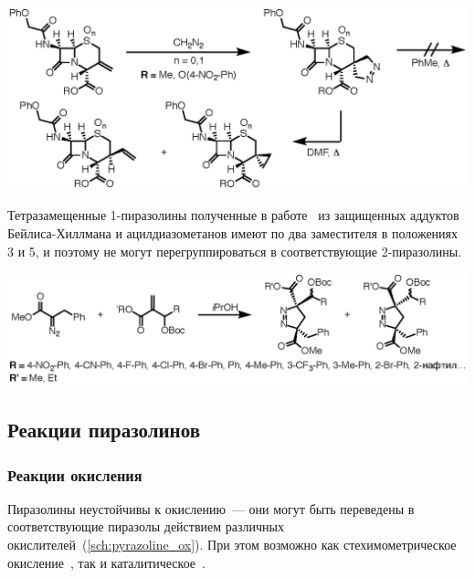\begin{scheme}
    \centering
    \includegraphics{sections/literature/img/cefalosporine.eps}
    \caption{}
    \label{sch:cefalosporine}
\end{scheme}

Тетразамещенные 1-пиразолины полученные в работе~\cite{Sun2013} из защищенных аддуктов Бейлиса-Хиллмана и ацилдиазометанов имеют по два заместителя в положениях 3 и 5, и поэтому не могут перегруппироваться в соответствующие 2-пиразолины.

\begin{scheme}
    \centering
    \includegraphics{sections/literature/img/1-pyrazoline-4.eps}
    \caption{}
    \label{sch:1-pyrazoline-4}
\end{scheme}

\FloatBarrier

\subsection{Реакции пиразолинов}

\subsubsection{Реакции окисления}
Пиразолины неустойчивы к окислению~--- они могут быть переведены в соответствующие пиразолы действием различных окислителей~(\ref{sch:pyrazoline_ox}).
При этом возможно как стехимометрическое окисление~\cite{Zolfigol2004, Dodwadmath1935, Gladstone1966, Auwers1927, Singh1997, Walker1967}, так и каталитическое~\cite{Nakamichi2002, Kojima2016, Shah1978}.

